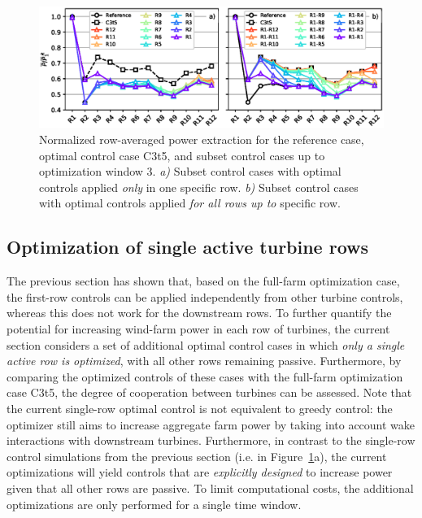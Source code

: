 \documentclass[wes, manuscript]{copernicus}
\begin{document}
\begin{figure}
	\includegraphics[width=\textwidth]{multirow.eps}
	\caption{Normalized row-averaged power extraction for the reference case, optimal control case C3t5, and subset control cases up to optimization window 3. \emph{a)} Subset control cases with optimal controls applied \emph{only} in one specific row. \emph{b)} Subset control cases with optimal controls applied \emph{for all rows up to} specific row. \label{fig:multirow}}
\end{figure}

\subsection{Optimization of single active turbine rows}\label{sec:optimization_single}
The previous section has shown that, based on the full-farm optimization case, the first-row controls can be applied independently from other turbine controls, whereas this does not work for the downstream rows. To further quantify the potential for increasing wind-farm power in each row of turbines, the current section considers a set of additional optimal control cases in which \emph{only a single active row is optimized}, with all other rows remaining passive. Furthermore, by comparing the optimized controls of these cases with the full-farm optimization case C3t5, the degree of cooperation between turbines can be assessed. Note that the current single-row optimal control is not equivalent to greedy control: the optimizer still aims to increase aggregate farm power by taking into account wake interactions with downstream turbines. Furthermore, in contrast to the single-row control simulations from the previous section (i.e. in Figure~\ref{fig:multirow}a), the current optimizations will yield controls that are \emph{explicitly designed} to increase power given that all other rows are passive. To limit computational costs, the additional optimizations are only performed for a single time window. 
\end{document}
